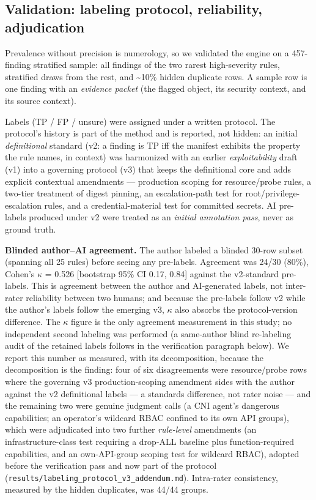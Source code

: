 \documentclass[pdflatex,sn-basic]{sn-jnl}
\begin{document}
\hypertarget{validation-labeling-protocol-reliability-adjudication}{%
\subsection{Validation: labeling protocol, reliability,
adjudication}\label{validation-labeling-protocol-reliability-adjudication}}

Prevalence without precision is numerology, so we validated the engine
on a 457-finding stratified sample: all findings of the two rarest
high-severity rules, stratified draws from the rest, and
\textasciitilde10\% hidden duplicate rows. A sample row is one finding
with an \emph{evidence packet} (the flagged object, its security
context, and its source context).

Labels (TP / FP / unsure) were assigned under a written protocol. The
protocol's history is part of the method and is reported, not hidden: an
initial \emph{definitional} standard (v2: a finding is TP iff the
manifest exhibits the property the rule names, in context) was
harmonized with an earlier \emph{exploitability} draft (v1) into a
governing protocol (v3) that keeps the definitional core and adds
explicit contextual amendments --- production scoping for resource/probe
rules, a two-tier treatment of digest pinning, an escalation-path test
for root/privilege-escalation rules, and a credential-material test for
committed secrets. AI pre-labels produced under v2 were treated as an
\emph{initial annotation pass}, never as ground truth.

\textbf{Blinded author--AI agreement.} The author labeled a blinded
30-row subset (spanning all 25 rules) before seeing any pre-labels.
Agreement was 24/30 (80\%), Cohen's $\kappa$ = 0.526 {[}bootstrap 95\% CI 0.17,
0.84{]} against the v2-standard pre-labels. This is agreement between
the author and AI-generated labels, not inter-rater reliability between
two humans; and because the pre-labels follow v2 while the author's
labels follow the emerging v3, $\kappa$ also absorbs the protocol-version
difference. The $\kappa$ figure is the only agreement measurement in this study; no independent second labeling was performed (a same-author blind re-labeling audit of the retained labels follows in the verification paragraph below). We report
this number as measured, with its
decomposition, because the decomposition is the finding: four of six
disagreements were resource/probe rows where the governing v3
production-scoping amendment sides with the author against the v2
definitional labels --- a standards difference, not rater noise --- and
the remaining two were genuine judgment calls (a CNI agent's dangerous
capabilities; an operator's wildcard RBAC confined to its own API
groups), which were adjudicated into two further \emph{rule-level}
amendments (an infrastructure-class test requiring a drop-ALL baseline
plus function-required capabilities, and an own-API-group scoping test
for wildcard RBAC), adopted before the verification pass and now part of
the protocol (\texttt{results/labeling\_protocol\_v3\_addendum.md}).
Intra-rater consistency, measured by the hidden duplicates, was 44/44
groups.
\end{document}
